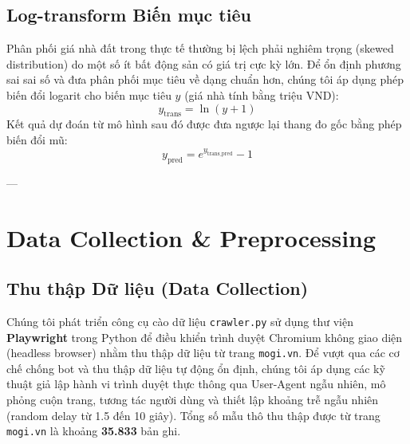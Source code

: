 \documentclass[sigconf]{acmart}
\begin{document}
\subsection{Log-transform Biến mục tiêu}
Phân phối giá nhà đất trong thực tế thường bị lệch phải nghiêm trọng (skewed distribution) do một số ít bất động sản có giá trị cực kỳ lớn. Để ổn định phương sai sai số và đưa phân phối mục tiêu về dạng chuẩn hơn, chúng tôi áp dụng phép biến đổi logarit cho biến mục tiêu $y$ (giá nhà tính bằng triệu VND):
\begin{equation}
    y_{\text{trans}} = \ln(y + 1)
\end{equation}
Kết quả dự đoán từ mô hình sau đó được đưa ngược lại thang đo gốc bằng phép biến đổi mũ:
\begin{equation}
    y_{\text{pred}} = e^{y_{\text{trans\_pred}}} - 1
\end{equation}

---

\section{Data Collection \& Preprocessing}

\subsection{Thu thập Dữ liệu (Data Collection)}
Chúng tôi phát triển công cụ cào dữ liệu \texttt{crawler.py} sử dụng thư viện \textbf{Playwright} trong Python để điều khiển trình duyệt Chromium không giao diện (headless browser) nhằm thu thập dữ liệu từ trang \texttt{mogi.vn}. Để vượt qua các cơ chế chống bot và thu thập dữ liệu tự động ổn định, chúng tôi áp dụng các kỹ thuật giả lập hành vi trình duyệt thực thông qua User-Agent ngẫu nhiên, mô phỏng cuộn trang, tương tác người dùng và thiết lập khoảng trễ ngẫu nhiên (random delay từ 1.5 đến 10 giây). Tổng số mẫu thô thu thập được từ trang \texttt{mogi.vn} là khoảng \textbf{35.833} bản ghi.
\end{document}
